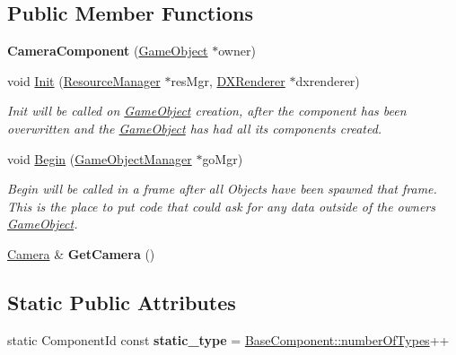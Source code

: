 \subsection*{Public Member Functions}
\begin{DoxyCompactItemize}
\item 
\mbox{\label{classCameraComponent_af29667817300732b1bf533ca8d1d3dee}} 
{\bfseries Camera\+Component} (\hyperlink{classGameObject}{Game\+Object} $\ast$owner)
\item 
void \hyperlink{classCameraComponent_ac1fd903a313d65bd8b7e8dcf7cab66b3}{Init} (\hyperlink{classResourceManager}{Resource\+Manager} $\ast$res\+Mgr, \hyperlink{classDXRenderer}{D\+X\+Renderer} $\ast$dxrenderer)
\begin{DoxyCompactList}\small\item\em Init will be called on \hyperlink{classGameObject}{Game\+Object} creation, after the component has been overwritten and the \hyperlink{classGameObject}{Game\+Object} has had all its components created. \end{DoxyCompactList}\item 
void \hyperlink{classCameraComponent_a5cd6dd7439bfb54edb12b45abe32967c}{Begin} (\hyperlink{classGameObjectManager}{Game\+Object\+Manager} $\ast$go\+Mgr)
\begin{DoxyCompactList}\small\item\em Begin will be called in a frame after all Objects have been spawned that frame. This is the place to put code that could ask for any data outside of the owner\textquotesingle{}s \hyperlink{classGameObject}{Game\+Object}. \end{DoxyCompactList}\item 
\mbox{\label{classCameraComponent_a47d07609d9132a2ed72a52c2bf59874c}} 
\hyperlink{classCamera}{Camera} \& {\bfseries Get\+Camera} ()
\end{DoxyCompactItemize}
\subsection*{Static Public Attributes}
\begin{DoxyCompactItemize}
\item 
\mbox{\label{classCameraComponent_a8c3fa86b0056b2735e289e7a0d181ed7}} 
static Component\+Id const {\bfseries static\+\_\+type} = \hyperlink{classBaseComponent_a084ade347bc71a7f0d3b17ecdc2225a4}{Base\+Component\+::number\+Of\+Types}++
\end{DoxyCompactItemize}
